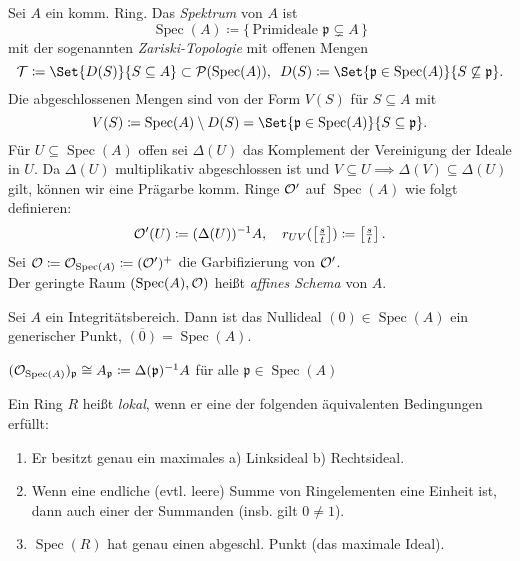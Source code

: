 \documentclass{cheat-sheet}
\newcommand{\Tau}{\mathcal{T}} %
\DeclareMathOperator{\Spec}{Spec} %
\newcommand{\Pow}{\mathcal{P}} %
\newcommand{\clos}[1]{\overline{#1}} %
\begin{document}

\begin{defn}
  Sei $A$ ein komm. Ring. Das \emph{Spektrum} von $A$ ist
  \[ \Spec(A) \coloneqq \{ \, \text{Primideale $\mathfrak{p} \subsetneq A$} \, \} \]
  mit der sogenannten \emph{Zariski-Topologie} mit offenen Mengen
  \[
    \Tau \coloneqq \Set{D(S)}{S \subseteq A} \subset \Pow(\Spec(A)), \enspace
    D(S) \coloneqq \Set{\mathfrak{p} \in \Spec(A)}{S \not\subseteq \mathfrak{p}}.
  \]
  Die abgeschlossenen Mengen sind von der Form $V(S)$ für $S \subseteq A$ mit
  \[
    V(S) \coloneqq \Spec(A) \setminus D(S) = \Set{\mathfrak{p} \in \Spec(A)}{S \subseteq \mathfrak{p}}.
  \]
  Für $U \subseteq \Spec(A)$ offen sei $\Delta(U)$ das Komplement der Vereinigung der Ideale in $U$.
  Da $\Delta(U)$ multiplikativ abgeschlossen ist und $V \subseteq U \!\implies\! \Delta(V) \subseteq \Delta(U)$ gilt, können wir eine Prägarbe komm. Ringe $\mathcal{O}'$ auf $\Spec(A)$ wie folgt definieren:
  \[
    \mathcal{O}'(U) \coloneqq (\Delta(U))^{-1} A, \quad
    r_{UV}(\left[\tfrac{s}{t}\right]) \coloneqq \left[\tfrac{s}{t}\right].
  \]
  Sei $\O \coloneqq \O_{\Spec(A)} \coloneqq (\O')^+$ die Garbifizierung von $\mathcal{O}'$. \\
  Der geringte Raum $(\Spec(A), \O)$ heißt \emph{affines Schema} von $A$.
\end{defn}

\begin{bem}
  Sei $A$ ein Integritätsbereich. Dann ist das Nullideal $(0) \in \Spec(A)$ ein generischer Punkt, \dh{} $\clos{(0)} = \Spec(A)$.
\end{bem}

\begin{lem}
  $(\O_{\Spec(A)})_{\mathfrak{p}} \cong A_{\mathfrak{p}} \coloneqq \Delta(\mathfrak{p})^{-1} A$ für alle $\mathfrak{p} \in \Spec(A)$
\end{lem}


\begin{defn}
  Ein Ring $R$ heißt \emph{lokal}, wenn er eine der folgenden äquivalenten Bedingungen erfüllt:
  \begin{enumerate}
    \item Er besitzt genau ein maximales \enspace a) Linksideal \enspace b) Rechtsideal.
    \item Wenn eine endliche (evtl. leere) Summe von Ringelementen eine Einheit ist, dann auch einer der Summanden (insb. gilt $0 \not= 1$).
    \item $\Spec(R)$ hat genau einen abgeschl. Punkt (das maximale Ideal).
  \end{enumerate}
\end{defn}
\end{document}
